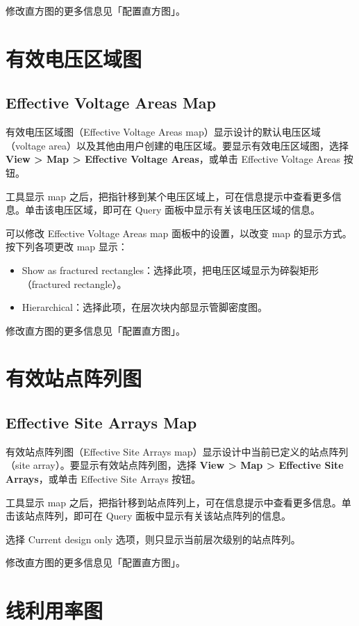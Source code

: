 修改直方图的更多信息见「配置直方图」。

\section{有效电压区域图}
\subsection*{Effective Voltage Areas Map}

有效电压区域图（Effective Voltage Areas map）显示设计的默认电压区域（voltage area）以及其他由用户创建的电压区域。要显示有效电压区域图，选择 \textbf{View > Map > Effective Voltage Areas}，或单击 Effective Voltage Areas 按钮。

工具显示 map 之后，把指针移到某个电压区域上，可在信息提示中查看更多信息。单击该电压区域，即可在 Query 面板中显示有关该电压区域的信息。

可以修改 Effective Voltage Areas map 面板中的设置，以改变 map 的显示方式。按下列各项更改 map 显示：
\begin{itemize}
  \item Show as fractured rectangles：选择此项，把电压区域显示为碎裂矩形（fractured rectangle）。
  \item Hierarchical：选择此项，在层次块内部显示管脚密度图。
\end{itemize}

修改直方图的更多信息见「配置直方图」。

\section{有效站点阵列图}
\subsection*{Effective Site Arrays Map}

有效站点阵列图（Effective Site Arrays map）显示设计中当前已定义的站点阵列（site array）。要显示有效站点阵列图，选择 \textbf{View > Map > Effective Site Arrays}，或单击 Effective Site Arrays 按钮。

工具显示 map 之后，把指针移到站点阵列上，可在信息提示中查看更多信息。单击该站点阵列，即可在 Query 面板中显示有关该站点阵列的信息。

选择 Current design only 选项，则只显示当前层次级别的站点阵列。

修改直方图的更多信息见「配置直方图」。

\section{线利用率图}
